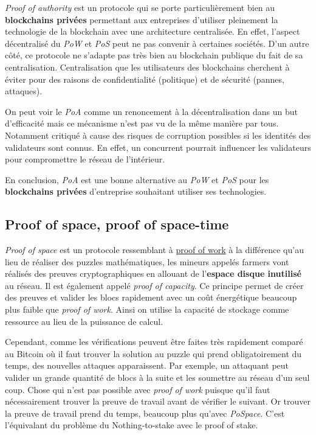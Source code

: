 \emph{Proof of authority} est un protocole qui se porte particulièrement bien au \textbf{blockchains privées} permettant aux entreprises d'utiliser pleinement la technologie de la blockchain avec une architecture centralisée. En effet, l'aspect décentralisé du \emph{PoW} et \emph{PoS} peut ne pas convenir à certaines sociétés. D'un autre côté, ce protocole ne s'adapte pas très bien au blockchain publique du fait de sa centralisation. Centralisation que les utilisateurs des blockchains cherchent à éviter pour des raisons de confidentialité (politique) et de sécurité (pannes, attaques).

On peut voir le \emph{PoA} comme un renoncement à la décentralisation dans un but d'efficacité mais ce mécanisme n'est pas vu de la même manière par tous. Notamment critiqué à cause des risques de corruption possibles si les identités des validateurs sont connus. En effet, un concurrent pourrait influencer les validateurs pour compromettre le réseau de l'intérieur.

En conclusion, \emph{PoA} est une bonne alternative au \emph{PoW} et \textit{PoS} pour les \textbf{blockchains privées} d'entreprise souhaitant utiliser ses technologies.

\subsection{Proof of space, proof of space-time}
\label{consensus:pospace}

\emph{Proof of space} est un protocole ressemblant à \hyperref[consensus:pow]{proof of work} à la différence qu'au lieu de réaliser des puzzles mathématiques, les mineurs appelés farmers vont réalisés des preuves cryptographiques en allouant de l'\textbf{espace disque inutilisé} au réseau. Il est également appelé \emph{proof of capacity}. Ce principe permet de créer des preuves et valider les blocs rapidement avec un coût énergétique beaucoup plus faible que \emph{proof of work}. Ainsi on utilise la capacité de stockage comme ressource au lieu de la puissance de calcul.

Cependant, comme les vérifications peuvent être faites très rapidement comparé au Bitcoin où il faut trouver la solution au puzzle qui prend obligatoirement du temps, des nouvelles attaques apparaissent. Par exemple, un attaquant peut valider un grande quantité de blocs à la suite et les soumettre au réseau d'un seul coup. Chose qui n'est pas possible avec \emph{proof of work} puisque qu'il faut nécessairement trouver la preuve de travail avant de vérifier le suivant. Or trouver la preuve de travail prend du temps, beaucoup plus qu'avec \emph{PoSpace}. C'est l'équivalant du problème du Nothing-to-stake avec le proof of stake. 

